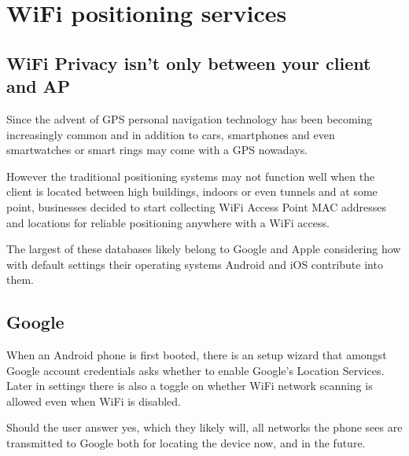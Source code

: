 \documentclass[../wifi-security.tex]{subfiles}
\begin{document}
\chapter{WiFi positioning services}

\section{WiFi Privacy isn't only between your client and AP}

Since the advent of GPS personal navigation technology has been becoming increasingly common and in addition to cars, smartphones and even smartwatches or smart rings may come with a GPS nowadays.

However the traditional positioning systems may not function well when the client is located between high buildings, indoors or even tunnels and at some point, businesses decided to start collecting WiFi Access Point MAC addresses and locations for reliable positioning anywhere with a WiFi access.

The largest of these databases likely belong to Google and Apple
considering how with default settings their operating systems Android and iOS contribute into them.



\section{Google}

When an Android phone is first booted, there is an setup wizard that amongst Google account credentials asks whether to enable Google's Location Services. Later in settings there is also a toggle on whether WiFi network scanning is allowed even when WiFi is disabled.

Should the user answer yes, which they likely will, all networks the phone sees are transmitted to Google both for locating the device now, and in the future.

\end{document}

